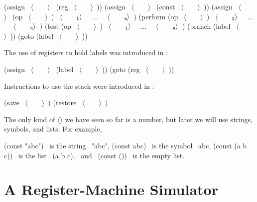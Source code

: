 \begin{codeBlock}
(assign ~\(\langle \)~~~~\(\rangle \)~ (reg ~\(\langle \)~~~~\(\rangle \)~))
(assign ~\(\langle \)~~~~\(\rangle \)~ (const ~\(\langle \)~~~~\(\rangle \)~))
(assign ~\(\langle \)~~~~\(\rangle \)~
        (op ~\(\langle \)~~~~\(\rangle \)~)
        ~\(\langle \)~~~~\(_{\mono{1}}\rangle \)~ ~\( \dots \)~ ~\(\langle \)~~~~\(_{\monoItalic{n}}\rangle \)~)
(perform (op ~\(\langle \)~~~~\(\rangle \)~) ~\(\langle \)~~~~\(_{\mono{1}}\rangle \)~ ~\( \dots \)~ ~\(\langle \)~~~~\(_{\monoItalic{n}}\rangle \)~)
(test (op ~\(\langle \)~~~~\(\rangle \)~) ~\(\langle \)~~~~\(_{\mono{1}}\rangle \)~ ~\( \dots \)~ ~\(\langle \)~~~~\(_{\monoItalic{n}}\rangle \)~)
(branch (label ~\(\langle \)~~~~\(\rangle \)~))
(goto (label ~\(\langle \)~~~~\(\rangle \)~))
\end{codeBlock}

\noindent
The use of registers to hold labels was introduced in :

\begin{codeBlock}
(assign ~\(\langle \)~~~~\(\rangle \)~ (label ~\(\langle \)~~~~\(\rangle \)~))
(goto (reg ~\(\langle \)~~~~\(\rangle \)~))
\end{codeBlock}

\noindent
Instructions to use the stack were introduced in :

\begin{codeBlock}
(save ~\(\langle \)~~~~\(\rangle \)~)
(restore ~\(\langle \)~~~~\(\rangle \)~)
\end{codeBlock}

\noindent
The only kind of \( \langle \)\( \rangle \) we have seen
so far is a number, but later we will use strings, symbols, and lists.
For example,
\begin{codeBlock}
(const "abc") ~\textrm{is the string}~ "abc",
(const abc) ~\textrm{is the symbol}~ abc,
(const (a b c)) ~\textrm{is the list}~ (a b c),
~\textrm{and}~ (const ()) ~\textrm{is the empty list.}~
\end{codeBlock}

\section{A Register-Machine Simulator}
\label{Section 5.2}

